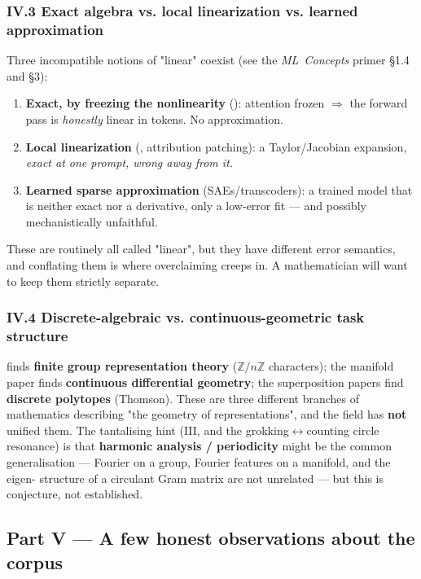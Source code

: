 \subsubsection*{IV.3 Exact algebra vs. local linearization vs. learned approximation}

Three incompatible notions of "linear" coexist (see the \emph{ML~Concepts} primer §1.4 and §3):

\begin{enumerate}
\item \textbf{Exact, by freezing the nonlinearity} (\textcite{framework}): attention frozen $\Rightarrow$ the forward pass is \emph{honestly} linear in tokens. No approximation.
\item \textbf{Local linearization} (\textcite{circuit-tracing-computational-graphs}, attribution patching): a Taylor/Jacobian expansion, \emph{exact at one prompt, wrong away from it.}
\item \textbf{Learned sparse approximation} (SAEs/transcoders): a trained model that is neither exact nor a derivative, only a low-error fit --- and possibly mechanistically unfaithful.
\end{enumerate}
These are routinely all called "linear", but they have different error semantics, and conflating them is where overclaiming creeps in. A mathematician will want to keep them strictly separate.


\subsubsection*{IV.4 Discrete-algebraic vs. continuous-geometric task structure}

\textcite{progress-measures-for-grokking} finds \textbf{finite group representation theory} ($\mathbb{Z}/n\mathbb{Z}$ characters); the manifold paper finds \textbf{continuous differential geometry}; the superposition papers find \textbf{discrete polytopes} (Thomson). These are three different branches of mathematics describing "the geometry of representations", and the field has \textbf{not} unified them. The tantalising hint (III, and the grokking$\leftrightarrow$counting circle resonance) is that \textbf{harmonic analysis / periodicity} might be the common generalisation --- Fourier on a group, Fourier features on a manifold, and the eigen- structure of a circulant Gram matrix are not unrelated --- but this is conjecture, not established.



\subsection*{Part V --- A few honest observations about the corpus}

